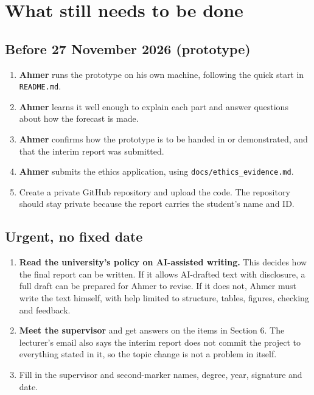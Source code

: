 \documentclass[11pt,a4paper]{article}
\newcommand{\file}[1]{\texttt{\small #1}}
\begin{document}
\section{What still needs to be done}
\subsection{Before 27 November 2026 (prototype)}
\begin{enumerate}
\item \textbf{Ahmer} runs the prototype on his own machine, following the quick start in \file{README.md}.
\item \textbf{Ahmer} learns it well enough to explain each part and answer questions about how the forecast is made.
\item \textbf{Ahmer} confirms how the prototype is to be handed in or demonstrated, and that the interim report was submitted.
\item \textbf{Ahmer} submits the ethics application, using \file{docs/ethics\_evidence.md}.
\item Create a private GitHub repository and upload the code. The repository should stay private because the report carries the student's name and ID.
\end{enumerate}

\subsection{Urgent, no fixed date}
\begin{enumerate}
\item \textbf{Read the university's policy on AI-assisted writing.} This decides how the final report can be written. If it allows AI-drafted text with disclosure, a full draft can be prepared for Ahmer to revise. If it does not, Ahmer must write the text himself, with help limited to structure, tables, figures, checking and feedback.
\item \textbf{Meet the supervisor} and get answers on the items in Section 6. The lecturer's email also says the interim report does not commit the project to everything stated in it, so the topic change is not a problem in itself.
\item Fill in the supervisor and second-marker names, degree, year, signature and date.
\end{enumerate}
\end{document}
